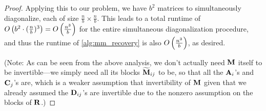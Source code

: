 \begin{proof}
Applying this to our problem, we have $b^2$ matrices to simultaneously diagonalize, each of size $\frac{n}{b} \times \frac{n}{b}$. This leads to a total runtime of $O\left( b^2 \cdot (\frac{n}{b})^3\right) = O\left( \frac{n^3}{b}\right)$ for the entire simultaneous diagonalization procedure, and thus the runtime of \cref{alg:mm_recovery} is also $O\left( \frac{n^3}{b}\right)$, as desired.

(Note: As can be seen from the above analysis, we don't actually need $\mathbf{M}$ itself to be invertible---we simply need all its blocks $\widetilde{\mathbf{M}}_{ij}$ to be, so that all the $\mathbf{A}_i$'s and $\mathbf{C}_j$'s are, which is a weaker assumption that invertibility of $\mathbf{M}$ given that we already assumed the $\mathbf{D}_{ij}$'s are invertible due to the nonzero assumption on the blocks of $\mathbf{R}$.)


\end{proof}



























